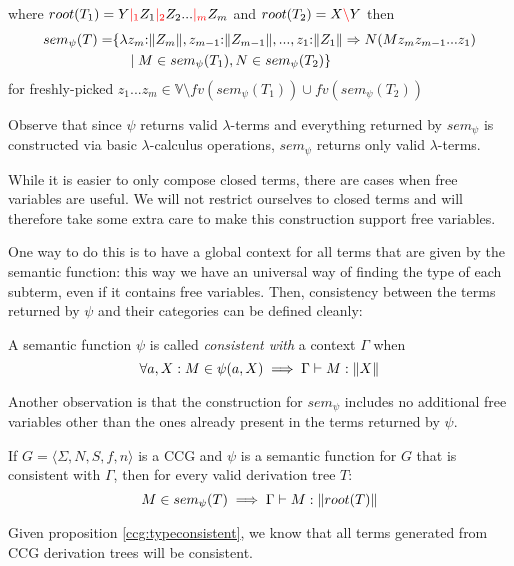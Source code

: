 \documentclass[main.tex]{subfiles}
\begin{document}
\begin{defn}
\begin{itemize}
\begin{center}
            \end{center}
            where $root(T_1) = Y \textcolor{red}{|_{1}} Z_1 \textcolor{red}{|_{2}} Z_2 ... \textcolor{red}{|_{m}} Z_m$ and $root(T_2) = X \textcolor{red}{\backslash} Y$ then
            \[
                \begin{split}
                    sem_{\psi}(T) =& \{
                        \lambda z_m {:} \|Z_m\|, z_{m - 1} {:} \|Z_{m - 1}\|, ..., z_1 {:} \|Z_1\| \Rightarrow
                        N ( M z_m z_{m - 1} ... z_1 ) \\
                        & \quad \mid M \in sem_{\psi}(T_1), N \in sem_{\psi}(T_2) \} \\
                \end{split}
            \]
            for freshly-picked
            $z_1 ... z_m \in \mathbb{V} \setminus fv(sem_{\psi}(T_1)) \cup fv(sem_{\psi}(T_2))$
    \end{itemize}
\end{defn}

Observe that since $\psi$ returns valid $\lambda$-terms and everything
returned by $sem_{\psi}$ is constructed via basic $\lambda$-calculus operations,
$sem_{\psi}$ returns only valid $\lambda$-terms.

While it is easier to only compose closed terms, there are cases when free
variables are useful. We will not restrict ourselves to closed terms and will
therefore take some extra care to make this construction support free variables.

One way to do this is to have a global context for all terms that are given
by the semantic function: this way we have an universal way of finding the
type of each subterm, even if it contains free variables. Then, consistency
between the terms returned by $\psi$ and their categories can be defined
cleanly:

\begin{defn}
    A semantic function $\psi$ is called \emph{consistent with} a context
    $\Gamma$ when
    \[
        \forall a, X: M \in \psi(a, X) \implies \Gamma \vdash M : \|X\|
    \]
\end{defn}

Another observation is that the construction for $sem_{\psi}$ includes no
additional free variables other than the ones already present in the terms
returned by $\psi$.

\begin{prop}
    \label{ccg:typeconsistent}
    If $ G = \langle \Sigma, N, S, f, n \rangle $ is a CCG and $\psi$ is a
    semantic function for $G$ that is consistent with $\Gamma$, then
    for every valid derivation tree $T$:
    \[
        M \in sem_{\psi}(T) \implies \Gamma \vdash M : \|root(T)\|
    \]
\end{prop}

Given proposition \autoref{ccg:typeconsistent}, we know that all terms generated
from CCG derivation trees will be consistent.
\end{document}
